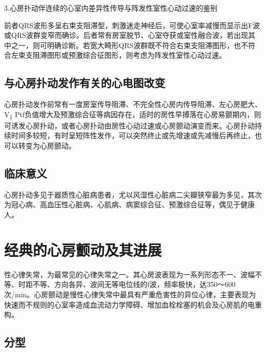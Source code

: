 3.心房扑动伴连续的心室内差异性传导与阵发性室性心动过速的鉴别

前者QRS波形多呈右束支阻滞型，刺激迷走神经后，可使心室率减慢而显示出F波或QRS波群变窄而确诊。后者常有房室脱节、心室夺获或室性融合波，若出现其中之一，则可明确诊断。若宽大畸形QRS波群既不符合右束支阻滞图形，也不符合左束支阻滞图形或预激综合征图形，则考虑为阵发性室性心动过速。

\protect\hypertarget{text00020.htmlux5cux23subid198}{}{}

\subsection{与心房扑动发作有关的心电图改变}

心房扑动发作前常有一度房室传导阻滞、不完全性心房内传导阻滞、左心房肥大、V\textsubscript{1}
Ptf负值增大及预激综合征等病因存在，适时的房性早搏落在心房易颤期内，则可诱发心房扑动，或者心房扑动由房性心动过速或心房颤动演变而来。心房扑动持续时间多较短，有时呈短阵性发作，可以突然终止或先增速或先减慢后再终止，也可以转变为心房颤动。

\protect\hypertarget{text00020.htmlux5cux23subid199}{}{}

\subsection{临床意义}

心房扑动多见于器质性心脏病患者，尤以风湿性心脏病二尖瓣狭窄最为多见，其次为冠心病、高血压性心脏病、心肌病、病窦综合征、预激综合征等，偶见于健康人。

\protect\hypertarget{text00020.htmlux5cux23subid200}{}{}

\section{经典的心房颤动及其进展}

  性心律失常，为最常见的心律失常之一。其心房波表现为一系列形态不一、波幅不等、时距不等、方向各异、波间无等电位线的f波，频率极快，达350～600次/min。心房颤动是慢性心律失常中最具有严重危害性的异位心律，主要表现为快速而不规则的心室率造成血流动力学障碍、增加血栓栓塞的机会及心房肌的电重构。

\protect\hypertarget{text00020.htmlux5cux23subid201}{}{}

\subsection{分型}

